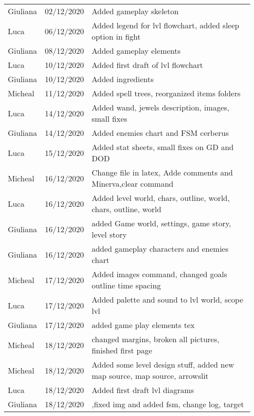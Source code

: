 \begin{tabular}{l l l}
Giuliana & 02/12/2020 &  Added gameplay skeleton\\
Luca & 06/12/2020 & Added legend for lvl flowchart, added sleep option in fight \\
Giuliana & 08/12/2020 & Added gameplay elements\\
Luca & 10/12/2020 & Added first draft of lvl flowchart\\
Giuliana & 10/12/2020 & Added ingredients\\
Micheal & 11/12/2020 & Added spell trees, reorganized items folders\\
Luca & 14/12/2020 &Added wand, jewels description, images, small fixes \\
Giuliana & 14/12/2020 & Added enemies chart and FSM cerberus\\
Luca & 15/12/2020 &  Added stat sheets, small fixes on GD and DOD\\
Micheal & 16/12/2020 & Change file in latex, Adde comments and Minerva,clear command \\
Luca & 16/12/2020 & Added level world, chars, outline, world, chars, outline, world\\
Giuliana & 16/12/2020 & added Game world, settings, game story, level story\\
Giuliana & 16/12/2020 & added gameplay characters and enemies chart\\
Micheal & 17/12/2020 & Added images command, changed goals outline time spacing\\
Luca & 17/12/2020 & Added palette and sound to lvl world, scope lvl\\
Giuliana & 17/12/2020 & added game play elements tex\\
Micheal & 18/12/2020 & changed margins, broken all pictures, finished first page \\
Micheal & 18/12/2020 & Added some level design stuff, added new map source, map source, arrowslit\\
Luca & 18/12/2020 & Added first draft lvl diagrams\\
Giuliana & 18/12/2020 & ,fixed img and added fsm, change log, target\\
\end{tabular}